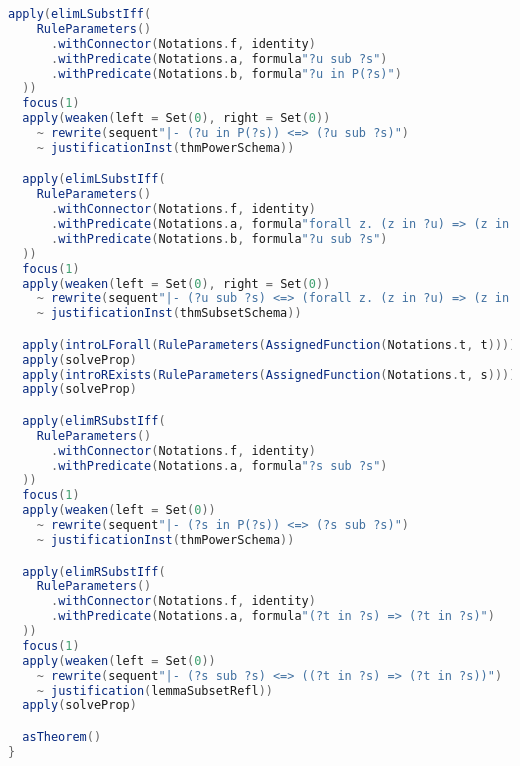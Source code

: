 \begin{lstlisting}[language=Scala,basicstyle=\fontsize{2.5}{4}\selectfont]
  apply(elimLSubstIff(
    RuleParameters()
      .withConnector(Notations.f, identity)
      .withPredicate(Notations.a, formula"?u sub ?s")
      .withPredicate(Notations.b, formula"?u in P(?s)")
  ))
  focus(1)
  apply(weaken(left = Set(0), right = Set(0))
    ~ rewrite(sequent"|- (?u in P(?s)) <=> (?u sub ?s)")
    ~ justificationInst(thmPowerSchema))

  apply(elimLSubstIff(
    RuleParameters()
      .withConnector(Notations.f, identity)
      .withPredicate(Notations.a, formula"forall z. (z in ?u) => (z in ?s)")
      .withPredicate(Notations.b, formula"?u sub ?s")
  ))
  focus(1)
  apply(weaken(left = Set(0), right = Set(0))
    ~ rewrite(sequent"|- (?u sub ?s) <=> (forall z. (z in ?u) => (z in ?s))")
    ~ justificationInst(thmSubsetSchema))

  apply(introLForall(RuleParameters(AssignedFunction(Notations.t, t))))
  apply(solveProp)
  apply(introRExists(RuleParameters(AssignedFunction(Notations.t, s))))
  apply(solveProp)

  apply(elimRSubstIff(
    RuleParameters()
      .withConnector(Notations.f, identity)
      .withPredicate(Notations.a, formula"?s sub ?s")
  ))
  focus(1)
  apply(weaken(left = Set(0))
    ~ rewrite(sequent"|- (?s in P(?s)) <=> (?s sub ?s)")
    ~ justificationInst(thmPowerSchema))

  apply(elimRSubstIff(
    RuleParameters()
      .withConnector(Notations.f, identity)
      .withPredicate(Notations.a, formula"(?t in ?s) => (?t in ?s)")
  ))
  focus(1)
  apply(weaken(left = Set(0))
    ~ rewrite(sequent"|- (?s sub ?s) <=> ((?t in ?s) => (?t in ?s))")
    ~ justification(lemmaSubsetRefl))
  apply(solveProp)

  asTheorem()
}
\end{lstlisting}
